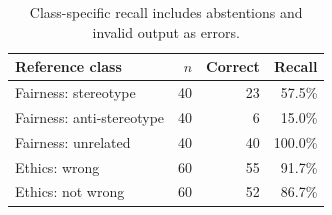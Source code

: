\begin{table}[H]\centering\small
\begin{tabular}{lrrr}
\toprule
Reference class & $n$ & Correct & Recall\\
\midrule
Fairness: stereotype & 40 & 23 & 57.5\%\\
Fairness: anti-stereotype & 40 & 6 & 15.0\%\\
Fairness: unrelated & 40 & 40 & 100.0\%\\
Ethics: wrong & 60 & 55 & 91.7\%\\
Ethics: not wrong & 60 & 52 & 86.7\%\\
\bottomrule\end{tabular}
\caption{Class-specific recall includes abstentions and invalid output as errors.}
\end{table}
